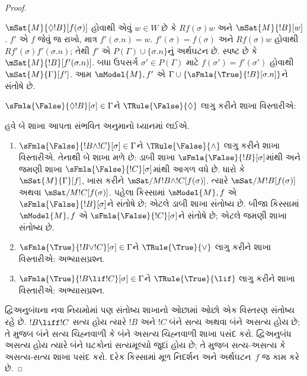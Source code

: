 \documentclass[../../../include/open-logic-section]{subfiles}
\begin{document}
\begin{proof}
\begin{enumerate}
{{  $\mSat{M}{\Diamond !B}[f(\sigma)]$ હોવાથી એવું $w \in W$
  છે કે $Rf(\sigma)w$ અને $\mSat{M}{!B}[w]$. $f'$ એ $f$
  જેવું જ રાખો, માત્ર $f'(\sigma.n) = w$.
  $f'(\sigma) = f(\sigma)$ અને $Rf(\sigma)w$ હોવાથી
  $Rf'(\sigma)f'(\sigma.n)$; તેથી $f'$ એ
  $P(\Gamma) \cup \{\sigma.n\}$નું અર્થઘટન છે. સ્પષ્ટ છે કે
  $\mSat{M}{!B}[f'(\sigma.n)]$. બધા ઉપસર્ગ
  $\sigma' \in P(\Gamma)$ માટે $f(\sigma') = f'(\sigma')$
  હોવાથી $\mSat{M}{\Gamma}[f']$. આમ $\mModel{M}, f'$ એ
  $\Gamma \cup \{\sFmla{\True}{!B}[\sigma.n]\}$ને સંતોષે છે.}
\item $\sFmla{\False}{\Diamond !B}[\sigma] \in \Gamma$ને
  $\TRule{\False}{\Diamond}$ લાગુ કરીને શાખા વિસ્તારીએ:
  }{}
\end{enumerate}
હવે બે શાખા આપતા સંભવિત અનુમાનો ધ્યાનમાં લઈએ.
\begin{enumerate}
\item $\sFmla{\False}{!B \land !C}[\sigma] \in \Gamma$ને
  $\TRule{\False}{\land}$ લાગુ કરીને શાખા વિસ્તારીએ. તેનાથી
  બે શાખા મળે છે: ડાબી શાખા $\sFmla{\False}{!B}[\sigma]$માંથી
  અને જમણી શાખા $\sFmla{\False}{!C}[\sigma]$માંથી આગળ વધે છે.
  ધારો કે $\mSat{M}{\Gamma}[f]$, ખાસ કરીને
  $\mSat/{M}{!B \land !C}[f(\sigma)]$. ત્યારે
  $\mSat/{M}{!B}[f(\sigma)]$ અથવા
  $\mSat/{M}{!C}[f(\sigma)]$. પહેલા કિસ્સામાં
  $\mModel{M}, f$ એ $\sFmla{\False}{!B}[\sigma]$ને સંતોષે છે;
  એટલે ડાબી શાખા સંતોષ્ય છે. બીજા કિસ્સામાં
  $\mModel{M}, f$ એ $\sFmla{\False}{!C}[\sigma]$ને સંતોષે છે;
  એટલે જમણી શાખા સંતોષ્ય છે.
\item $\sFmla{\True}{!B \lor !C}[\sigma] \in \Gamma$ને
    $\TRule{\True}{\lor}$ લાગુ કરીને શાખા વિસ્તારીએ:
    અભ્યાસપ્રશ્ન.
\item $\sFmla{\True}{!B \lif !C}[\sigma] \in \Gamma$ને
    $\TRule{\True}{\lif}$ લાગુ કરીને શાખા વિસ્તારીએ:
    અભ્યાસપ્રશ્ન.
\end{enumerate}
દ્વિઅનુબંધના નવા નિયમોમાં પણ સંતોષ્ય શાખાનો ઓછામાં ઓછો
એક વિસ્તરણ સંતોષ્ય રહે છે. $!B \liff !C$ સત્ય હોય ત્યારે
$!B$ અને $!C$ બંને સત્ય અથવા બંને અસત્ય હોય છે; તે મુજબ
બંને સત્ય ચિહ્નવાળી કે બંને અસત્ય ચિહ્નવાળી શાખા પસંદ કરો.
દ્વિઅનુબંધ અસત્ય હોય ત્યારે બંને ઘટકોનાં સત્યમૂલ્યો જુદાં
હોય છે; તે મુજબ સત્ય-અસત્ય કે અસત્ય-સત્ય શાખા પસંદ કરો.
દરેક કિસ્સામાં મૂળ નિદર્શન અને અર્થઘટન~$f$ જ કામ કરે છે.
\end{proof}
\end{document}
